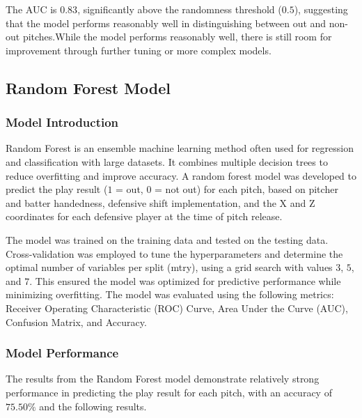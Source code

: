 \documentclass{article}
\begin{document}
The AUC is $0.83$, significantly above the randomness threshold ($0.5$), suggesting that the model performs reasonably well in distinguishing between out and non-out pitches.While the model performs reasonably well, there is still room for improvement through further tuning or more complex models.

\subsection{Random Forest Model}
\subsubsection{Model Introduction}
Random Forest is an ensemble machine learning method often used for regression and classification with large datasets. It combines multiple decision trees to reduce overfitting and improve accuracy. A random forest model was developed to predict the play result ($1$ = out, $0$ = not out) for each pitch, based on pitcher and batter handedness, defensive shift implementation, and the X and Z coordinates for each defensive player at the time of pitch release.

The model was trained on the training data and tested on the testing data. Cross-validation was employed to tune the hyperparameters and determine the optimal number of variables per split (mtry), using a grid search with values $3$, $5$, and $7$. This ensured the model was optimized for predictive performance while minimizing overfitting. The model was evaluated using the following metrics: Receiver Operating Characteristic (ROC) Curve, Area Under the Curve (AUC), Confusion Matrix, and Accuracy. 

\subsubsection{Model Performance}

The results from the Random Forest model demonstrate relatively strong performance in predicting the play result for each pitch, with an accuracy of $75.50\%$ and the following results. 
\end{document}
